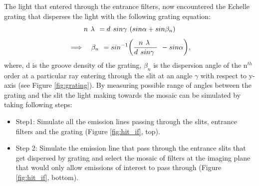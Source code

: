 \documentclass[crop=false,class=mitthesis,oneside,font=12pt]{standalone}
\begin{document}
The light that entered through the entrance filters, now encountered the Echelle grating that disperses the light with the following grating equation:
\begin{equation*}
\large
{n~\lambda~=d~sin\gamma~(sin\alpha + sin\beta_n)}
\end{equation*}
\begin{equation}
\large
\implies~~\beta_n~=sin^{-1}\Big(\frac{n~\lambda~}{d~sin\gamma~}~-sin\alpha\Big),
\end{equation}
where, d is the groove density of the grating, $\beta_n$ is the dispersion angle of the n$^{th}$ order at a particular ray entering through the slit at an angle $\gamma$ with respect to y-axis (see Figure \ref{fig:grating}). By measuring possible range of angles between the grating and the slit the light making towards the mosaic can be simulated by taking following steps:
\begin{itemize}
\item Step1: Simulate all the emission lines passing through the slits, entrance filters and the grating (Figure \ref{fig:hit_if}, top). 
\item Step 2: Simulate the emission line that pass through the entrance slits that get dispersed by grating and select the mosaic of filters at the imaging plane that would only allow emissions of interest to pass through (Figure \ref{fig:hit_if}, bottom).
\end{itemize}
\end{document}
